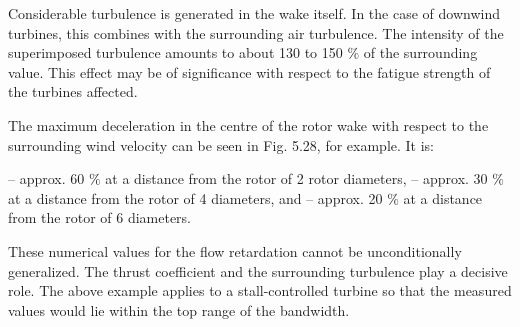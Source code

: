 Considerable turbulence is generated in the wake itself. In the case of downwind turbines, this combines with the surrounding air turbulence. The intensity of the superimposed turbulence amounts to about 130 to 150 $\%$ of the surrounding value. This effect may be of significance with respect to the fatigue strength of the turbines affected.

The maximum deceleration in the centre of the rotor wake with respect to the surrounding wind velocity can be seen in Fig. 5.28, for example. It is:

– approx. 60 $\%$ at a distance from the rotor of 2 rotor diameters,
– approx. 30 $\%$ at a distance from the rotor of 4 diameters, and
– approx. 20 $\%$ at a distance from the rotor of 6 diameters.

These numerical values for the flow retardation cannot be unconditionally generalized. The thrust coefficient and the surrounding turbulence play a decisive role. The above example applies to a stall-controlled turbine so that the measured values would lie within the top range of the bandwidth.
















